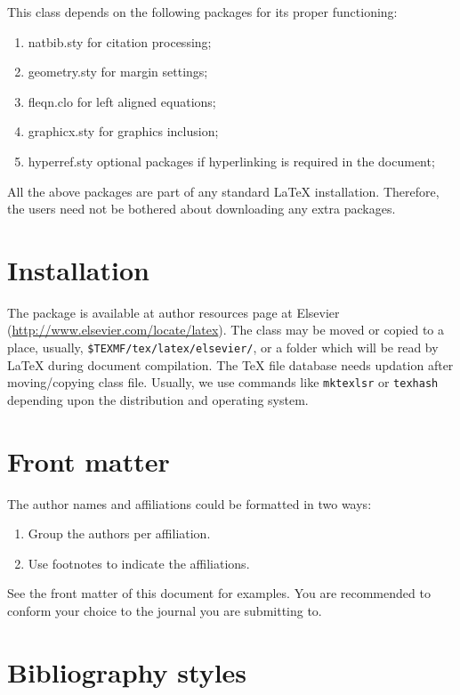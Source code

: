 \documentclass[a4paper,fleqn]{cas-dc}
\begin{document}
This class depends on the following packages
for its proper functioning:

\begin{enumerate}
\itemsep=0pt
\item {natbib.sty} for citation processing;
\item {geometry.sty} for margin settings;
\item {fleqn.clo} for left aligned equations;
\item {graphicx.sty} for graphics inclusion;
\item {hyperref.sty} optional packages if hyperlinking is
  required in the document;
\end{enumerate}  

All the above packages are part of any
standard \LaTeX{} installation.
Therefore, the users need not be
bothered about downloading any extra packages.

\section{Installation}

The package is available at author resources page at Elsevier
(\url{http://www.elsevier.com/locate/latex}).
The class may be moved or copied to a place, usually,\linebreak
\verb+$TEXMF/tex/latex/elsevier/+, %
or a folder which will be read                   
by \LaTeX{} during document compilation.  The \TeX{} file
database needs updation after moving/copying class file.  Usually,
we use commands like \verb+mktexlsr+ or \verb+texhash+ depending
upon the distribution and operating system.

\section{Front matter}

The author names and affiliations could be formatted in two ways:
\begin{enumerate}[(1)]
\item Group the authors per affiliation.
\item Use footnotes to indicate the affiliations.
\end{enumerate}
See the front matter of this document for examples. 
You are recommended to conform your choice to the journal you 
are submitting to.

\section{Bibliography styles}
\end{document}
